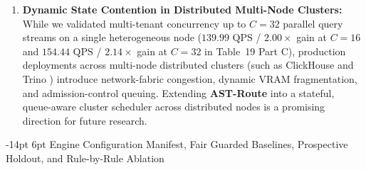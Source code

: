 \documentclass[10pt,a4paper]{article}
\makeatletter
\renewcommand\subsection{\@startsection{subsection}{2}{\z@}%
  {-14pt \@plus -3pt \@minus -1.5pt}%
  {6pt \@plus 1.5pt}%
  {\normalfont\normalsize\bfseries}}
\makeatother
\begin{document}
\begin{enumerate}[leftmargin=1.5em,itemsep=2pt]
    \item \textbf{Dynamic State Contention in Distributed Multi-Node Clusters:} While we validated multi-tenant concurrency up to $C=32$ parallel query streams on a single heterogeneous node ($139.99\text{ QPS}$ / $2.00\times$ gain at $C=16$ and $154.44\text{ QPS}$ / $2.14\times$ gain at $C=32$ in Table~19 Part C), production deployments across multi-node distributed clusters (such as ClickHouse \cite{schulze2024clickhouse} and Trino \cite{sethi2019presto}) introduce network-fabric congestion, dynamic VRAM fragmentation, and admission-control queuing. Extending \textbf{AST-Route} into a stateful, queue-aware cluster scheduler across distributed nodes is a promising direction for future research.
\end{enumerate}

\subsection{Engine Configuration Manifest, Fair Guarded Baselines, Prospective Holdout, and Rule-by-Rule Ablation}
\label{sec:v852_reviewer_audit}
\end{document}
